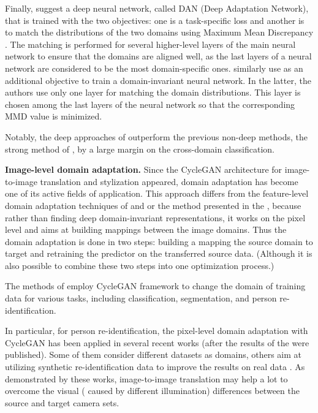 Finally, \citep{LongC0J15} suggest a deep neural network, called DAN (Deep Adaptation
Network), that is trained with the two objectives: one is a task-specific loss and another is to match the distributions of the two domains using Maximum Mean Discrepancy . The matching is performed for several higher-level layers of the main neural network to ensure that the domains are aligned well, as the last layers of a neural network are considered to be the most domain-specific ones. \citep{tzeng2014deep} similarly use  as an additional objective to train a domain-invariant neural network. In the latter, the authors use only one layer for matching the domain distributions. This layer is chosen among the last layers of the neural network so that the corresponding MMD value is minimized.

Notably, the deep approaches of \citep{chopra2013dlid, tzeng2014deep, LongC0J15} outperform the previous non-deep methods, \eg{} the strong method of \citep{gong2012geodesic}, by a large margin on the cross-domain classification.

\bigskip\ident\textbf{Image-level domain adaptation.}
Since the CycleGAN \citep{ZhuPIE17} architecture for image-to-image translation and stylization appeared, domain adaptation has become one of its active fields of application. This approach differs from the feature-level domain adaptation techniques of \citep{LongC0J15} and \citep{tzeng2014deep} or the method presented in the , because rather than finding deep domain-invariant representations, it works on the pixel level and aims at building mappings between the image domains. Thus the domain adaptation is done in two steps: building a mapping the source domain to target and retraining the predictor on the transferred source data. (Although it is also possible to combine these two steps into one optimization process.)%


The methods of \citep{Hoffman17,Deng_2018_CVPR,Murez_2018_CVPR} employ CycleGAN framework to change the domain of training data for various tasks, including classification, segmentation, and person re-identification. 

In particular, for person re-identification, the pixel-level domain adaptation with CycleGAN has been applied in several recent works \citep{zhong2018camera, Deng_2018_CVPR} (after the results of the  were published). Some of them consider different datasets as domains, others aim at utilizing synthetic re-identification data to improve the results on real data \citep{bak2018domain}. As demonstrated by these works, image-to-image translation may help a lot to overcome the visual (\eg{} caused by different illumination) differences between the source and target camera sets.


